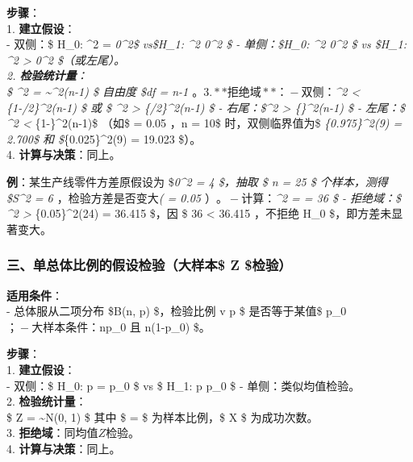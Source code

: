 \textbf{步骤}：\\
1. \textbf{建立假设}：\\
- 双侧：\$ H\_0: \sigma\^{}2 = \sigma\emph{0\^{}2\$ vs\$H\_1:
\sigma\^{}2 \neq \sigma\emph{0\^{}2 \$ - 单侧：\$H\_0: \sigma\^{}2
\leq \sigma\emph{0\^{}2 \$ vs \$H\_1: \sigma\^{}2 \textgreater{}
\sigma\emph{0\^{}2 \$（或左尾）。\\
2. \textbf{检验统计量}：\\
\$ \chi\^{}2 =  \sim \chi\^{}2(n-1) \$ 自由度
\$df = n-1 \(。 3. **拒绝域**：  - 双侧：\)\chi\^{}2 \textless{}
\chi}\{1-\alpha/2\}\^{}2(n-1) \$ 或 \$ \chi\^{}2 \textgreater{}
\chi}\{\alpha/2\}\^{}2(n-1) \$ - 右尾：\$\chi\^{}2 \textgreater{}
\chi}\{\alpha\}\^{}2(n-1) \$ - 左尾：\$ \chi\^{}2 \textless{}
\chi}\{1-\alpha\}\^{}2(n-1)\$ （如\$ \alpha = 0.05 \(，\)n = 10\$
时，双侧临界值为\$ \chi\emph{\{0.975\}\^{}2(9) = 2.700\$ 和
\$\chi}\{0.025\}\^{}2(9) = 19.023 \$）。\\
4. \textbf{计算与决策}：同上。

\textbf{例}：某生产线零件方差原假设为 \$\sigma\emph{0\^{}2 = 4 \$，抽取
\$ n = 25 \$ 个样本，测得 \$S\^{}2 = 6 \(，检验方差是否变大\)( \alpha =
0.05 \(）。 - 计算：\)\chi\^{}2 =  = 36 \$ -
拒绝域：\$ \chi\^{}2 \textgreater{} \chi}\{0.05\}\^{}2(24) = 36.415
\$，因 \$ 36 \textless{} 36.415 \(，不拒绝\) H\_0 \$，即方差未显著变大。

\hypertarget{ux4e09ux5355ux603bux4f53ux6bd4ux4f8bux7684ux5047ux8bbeux68c0ux9a8cux5927ux6837ux672c-z-ux68c0ux9a8c}{%
\subsubsection{\texorpdfstring{\textbf{三、单总体比例的假设检验（大样本\$
Z
\$检验）}}{三、单总体比例的假设检验（大样本\$ Z \$检验）}}\label{ux4e09ux5355ux603bux4f53ux6bd4ux4f8bux7684ux5047ux8bbeux68c0ux9a8cux5927ux6837ux672c-z-ux68c0ux9a8c}}

\textbf{适用条件}：\\
- 总体服从二项分布 \$B(n, p) \$，检验比例 v p \$ 是否等于某值\$ p\_0
\(； - 大样本条件：\)np\_0 \(且\) n(1-p\_0)  \$。

\textbf{步骤}：\\
1. \textbf{建立假设}：\\
- 双侧：\$ H\_0: p = p\_0 \$ vs \$ H\_1: p \neq p\_0 \$ -
单侧：类似均值检验。\\
2. \textbf{检验统计量}：\\
\$ Z =  \sim N(0, 1) \$
其中 \$ =  \$ 为样本比例，\$ X \$ 为成功次数。\\
3. \textbf{拒绝域}：同均值\(Z\)检验。\\
4. \textbf{计算与决策}：同上。

